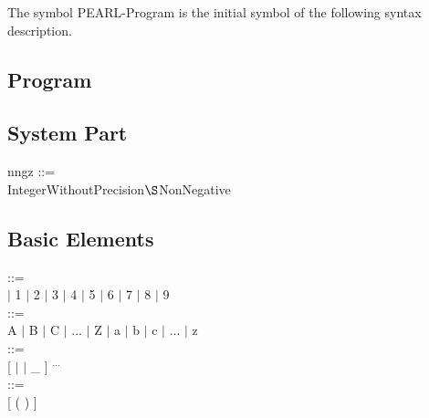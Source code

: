 The symbol PEARL-Program is the initial symbol of the following syntax
description.

\subsection{Program}    %





\subsection{System Part}   %













\begin{removed}
nngz ::= \\
\x IntegerWithoutPrecision$\S $NonNegative
\end{removed}


\subsection{Basic Elements}    %

 ::=\\
 $\mid$ 1 $\mid$ 2 $\mid$ 3 $\mid$ 4 $\mid$ 5 $\mid$ 6 $\mid$ 7 $\mid$ 8 $\mid$ 9\\

 ::= \\
\x A $\mid$ B $\mid$ C $\mid$ ... $\mid$ Z $\mid$ a $\mid$ b $\mid$ c $\mid$ ... $\mid$ z\\

 ::=\\
\x {} [  $\mid$  $\mid$ \_ ] $^{...}$\\



 



 ::=\\
\x {} [ (  ) ]\\

